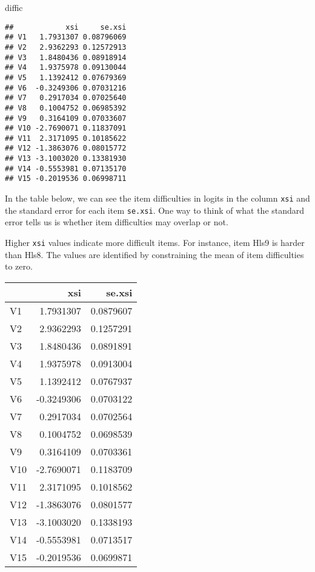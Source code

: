 \documentclass[
]{book}
\newenvironment{Shaded}{\begin{snugshade}}{\end{snugshade}}
\newcommand{\NormalTok}[1]{#1}
\begin{document}
\begin{Shaded}
\begin{Highlighting}[]
\NormalTok{diffic}
\end{Highlighting}
\end{Shaded}

\begin{verbatim}
##            xsi     se.xsi
## V1   1.7931307 0.08796069
## V2   2.9362293 0.12572913
## V3   1.8480436 0.08918914
## V4   1.9375978 0.09130044
## V5   1.1392412 0.07679369
## V6  -0.3249306 0.07031216
## V7   0.2917034 0.07025640
## V8   0.1004752 0.06985392
## V9   0.3164109 0.07033607
## V10 -2.7690071 0.11837091
## V11  2.3171095 0.10185622
## V12 -1.3863076 0.08015772
## V13 -3.1003020 0.13381930
## V14 -0.5553981 0.07135170
## V15 -0.2019536 0.06998711
\end{verbatim}

In the table below, we can see the item difficulties in logits in the column \texttt{xsi} and the standard error for each item \texttt{se.xsi}. One way to think of what the standard error tells us is whether item difficulties may overlap or not.

Higher \texttt{xsi} values indicate more difficult items. For instance, item Hls9 is harder than Hls8. The values are identified by constraining the mean of item difficulties to zero.

\begin{tabular}{l|r|r}
\hline
  & xsi & se.xsi\\
\hline
V1 & 1.7931307 & 0.0879607\\
\hline
V2 & 2.9362293 & 0.1257291\\
\hline
V3 & 1.8480436 & 0.0891891\\
\hline
V4 & 1.9375978 & 0.0913004\\
\hline
V5 & 1.1392412 & 0.0767937\\
\hline
V6 & -0.3249306 & 0.0703122\\
\hline
V7 & 0.2917034 & 0.0702564\\
\hline
V8 & 0.1004752 & 0.0698539\\
\hline
V9 & 0.3164109 & 0.0703361\\
\hline
V10 & -2.7690071 & 0.1183709\\
\hline
V11 & 2.3171095 & 0.1018562\\
\hline
V12 & -1.3863076 & 0.0801577\\
\hline
V13 & -3.1003020 & 0.1338193\\
\hline
V14 & -0.5553981 & 0.0713517\\
\hline
V15 & -0.2019536 & 0.0699871\\
\hline
\end{tabular}
\end{document}
